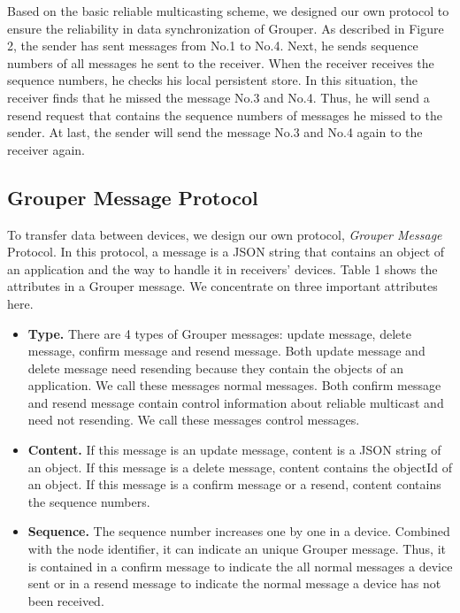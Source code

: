 \documentclass[twocolumn,10pt]{article}
\begin{document}
Based on the basic reliable multicasting scheme, we designed our own protocol to ensure the reliability in data synchronization of Grouper. 
As described in Figure 2, the sender has sent messages from No.1 to No.4. 
Next, he sends sequence numbers of all messages he sent to the receiver. 
When the receiver receives the sequence numbers, he checks his local persistent store. 
In this situation, the receiver finds that he missed the message No.3 and No.4. 
Thus, he will send a resend request that contains the sequence numbers of messages he missed to the sender. 
At last, the sender will send the message No.3 and No.4 again to the receiver again.

\subsection{Grouper Message Protocol}

To transfer data between devices, we design our own protocol, \emph{Grouper Message} Protocol. 
In this protocol, a message is a JSON string that contains an object of an application and the way to handle it in receivers’ devices.
Table 1 shows the attributes in a Grouper message.
We concentrate on three important attributes here.

\begin{itemize}
	\setlength{\itemsep}{1pt}
	\setlength{\parskip}{0pt}
	\setlength{\parsep}{0pt}
	\item \textbf{Type.}
	There are 4 types of Grouper messages: update message, delete message, confirm message and resend message. 
	Both update message and delete message need resending because they contain the objects of an application. 
	We call these messages normal messages. 
	Both confirm message and resend message contain control information about reliable multicast and need not resending. 
	We call these messages control messages.
	\item \textbf{Content.} 
	If this message is an update message, content is a JSON string of an object.
	If this message is a delete message, content contains the objectId of an object.
	If this message is a confirm message or a resend, content contains the sequence numbers.
	\item \textbf{Sequence.}
	The sequence number increases one by one in a device.
	Combined with the node identifier, it can indicate an unique Grouper message.
	Thus, it is contained in a confirm message to indicate the all normal messages a device sent or in a resend message to indicate the normal message a device has not been received.
\end{itemize}
\end{document}

